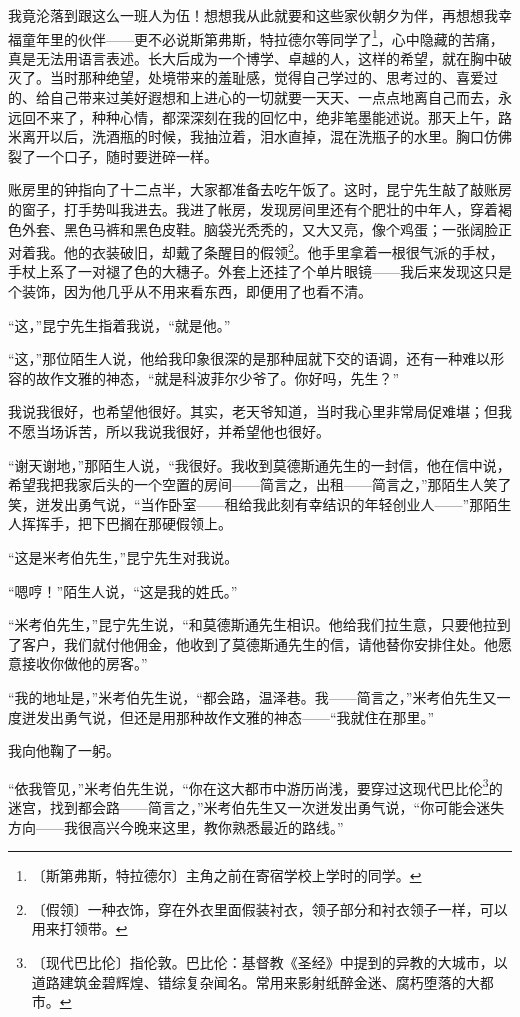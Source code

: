 \documentclass[12pt,UTF-8,openany]{ctexbook}
\begin{document}
\begin{normalsize}
    我竟沦落到跟这么一班人为伍！想想我从此就要和这些家伙朝夕为伴，再想想我幸福童年里的伙伴——更不必说斯第弗斯，特拉德尔等同学了\footnote{〔斯第弗斯，特拉德尔〕主角之前在寄宿学校上学时的同学。}，心中隐藏的苦痛，真是无法用语言表述。长大后成为一个博学、卓越的人，这样的希望，就在胸中破灭了。当时那种绝望，处境带来的羞耻感，觉得自己学过的、思考过的、喜爱过的、给自己带来过美好遐想和上进心的一切就要一天天、一点点地离自己而去，永远回不来了，种种心情，都深深刻在我的回忆中，绝非笔墨能述说。那天上午，路米离开以后，洗酒瓶的时候，我抽泣着，泪水直掉，混在洗瓶子的水里。胸口仿佛裂了一个口子，随时要迸碎一样。
    
    账房里的钟指向了十二点半，大家都准备去吃午饭了。这时，昆宁先生敲了敲账房的窗子，打手势叫我进去。我进了帐房，发现房间里还有个肥壮的中年人，穿着褐色外套、黑色马裤和黑色皮鞋。脑袋光秃秃的，又大又亮，像个鸡蛋；一张阔脸正对着我。他的衣装破旧，却戴了条醒目的假领\footnote{〔假领〕一种衣饰，穿在外衣里面假装衬衣，领子部分和衬衣领子一样，可以用来打领带。}。他手里拿着一根很气派的手杖，手杖上系了一对褪了色的大穗子。外套上还挂了个单片眼镜——我后来发现这只是个装饰，因为他几乎从不用来看东西，即便用了也看不清。
    
    “这，”昆宁先生指着我说，“就是他。”
    
    “这，”那位陌生人说，他给我印象很深的是那种屈就下交的语调，还有一种难以形容的故作文雅的神态，“就是科波菲尔少爷了。你好吗，先生？”
    
    我说我很好，也希望他很好。其实，老天爷知道，当时我心里非常局促难堪；但我不愿当场诉苦，所以我说我很好，并希望他也很好。
    
    “谢天谢地，”那陌生人说，“我很好。我收到莫德斯通先生的一封信，他在信中说，希望我把我家后头的一个空置的房间——简言之，出租——简言之，”那陌生人笑了笑，迸发出勇气说，“当作卧室——租给我此刻有幸结识的年轻创业人——”那陌生人挥挥手，把下巴搁在那硬假领上。
    
    “这是米考伯先生，”昆宁先生对我说。
    
    “嗯哼！”陌生人说，“这是我的姓氏。”
    
    “米考伯先生，”昆宁先生说，“和莫德斯通先生相识。他给我们拉生意，只要他拉到了客户，我们就付他佣金，他收到了莫德斯通先生的信，请他替你安排住处。他愿意接收你做他的房客。”
    
    “我的地址是，”米考伯先生说，“都会路，温泽巷。我——简言之，”米考伯先生又一度迸发出勇气说，但还是用那种故作文雅的神态——“我就住在那里。”
    
    我向他鞠了一躬。
    
    “依我管见，”米考伯先生说，“你在这大都市中游历尚浅，要穿过这现代巴比伦\footnote{〔现代巴比伦〕指伦敦。巴比伦：基督教《圣经》中提到的异教的大城市，以道路建筑金碧辉煌、错综复杂闻名。常用来影射纸醉金迷、腐朽堕落的大都市。}的迷宫，找到都会路——简言之，”米考伯先生又一次迸发出勇气说，“你可能会迷失方向——我很高兴今晚来这里，教你熟悉最近的路线。”
    

\end{normalsize}
\end{document}
